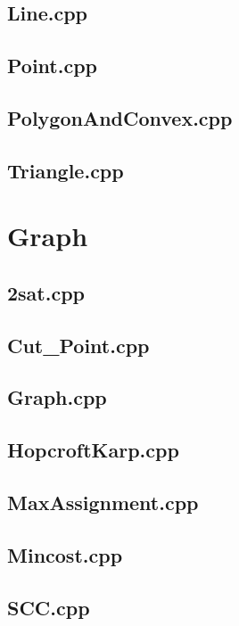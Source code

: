 \subsection{Line.cpp}

\subsection{Point.cpp}

\subsection{PolygonAndConvex.cpp}

\subsection{Triangle.cpp}

\section{Graph}
\subsection{2sat.cpp}

\subsection{Cut\_Point.cpp}

\subsection{Graph.cpp}

\subsection{HopcroftKarp.cpp}

\subsection{MaxAssignment.cpp}

\subsection{Mincost.cpp}

\subsection{SCC.cpp}

